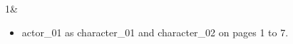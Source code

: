 1&\begin{itemize}
\item actor\_01 as character\_01 and character\_02 on pages 1 to 7.\end{itemize}
\\\hline
